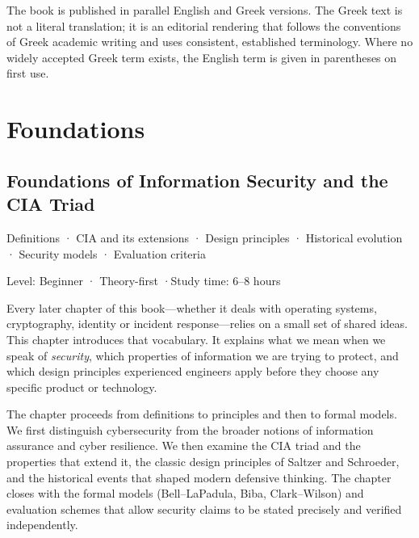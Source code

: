 \documentclass[11pt,openany]{book}
\newcommand{\chaptermeta}[3]{%
  {\sffamily\small\color{accent}#1\par}\vspace{0.3em}
  {\sffamily\footnotesize\color{gray}#2 \quad·\quad #3\par}\vspace{1.2em}}
\begin{document}
The book is published in parallel English and Greek versions. The Greek text is not a literal translation; it is an editorial rendering that follows the conventions of Greek academic writing and uses consistent, established terminology. Where no widely accepted Greek term exists, the English term is given in parentheses on first use.


\mainmatter
\part{Foundations}
\chapter{Foundations of Information Security and the CIA Triad}\label{ch:1}
\chaptermeta{Definitions · CIA and its extensions · Design principles · Historical evolution · Security models · Evaluation criteria}{Level: Beginner · Theory-first}{Study time: 6–8 hours}

Every later chapter of this book—whether it deals with operating systems, cryptography, identity or incident response—relies on a small set of shared ideas. This chapter introduces that vocabulary. It explains what we mean when we speak of \emph{security}, which properties of information we are trying to protect, and which design principles experienced engineers apply before they choose any specific product or technology.

The chapter proceeds from definitions to principles and then to formal models. We first distinguish cybersecurity from the broader notions of information assurance and cyber resilience. We then examine the CIA triad and the properties that extend it, the classic design principles of Saltzer and Schroeder, and the historical events that shaped modern defensive thinking. The chapter closes with the formal models (Bell–LaPadula, Biba, Clark–Wilson) and evaluation schemes that allow security claims to be stated precisely and verified independently.
\end{document}
